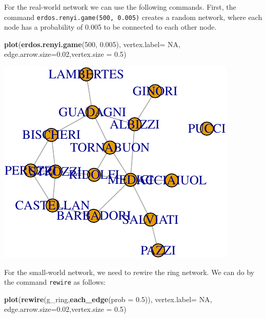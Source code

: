 \documentclass[]{article}
\newenvironment{Shaded}{\begin{snugshade}}{\end{snugshade}}
\newcommand{\KeywordTok}[1]{\textcolor[rgb]{0.13,0.29,0.53}{\textbf{{#1}}}}
\newcommand{\DataTypeTok}[1]{\textcolor[rgb]{0.13,0.29,0.53}{{#1}}}
\newcommand{\DecValTok}[1]{\textcolor[rgb]{0.00,0.00,0.81}{{#1}}}
\newcommand{\FloatTok}[1]{\textcolor[rgb]{0.00,0.00,0.81}{{#1}}}
\newcommand{\OtherTok}[1]{\textcolor[rgb]{0.56,0.35,0.01}{{#1}}}
\newcommand{\NormalTok}[1]{{#1}}
\begin{document}
For the real-world network we can use the following commands. First, the
command \texttt{erdos.renyi.game(500,\ 0.005)} creates a random network,
where each node has a probability of 0.005 to be connected to each other
node.

\begin{Shaded}
\begin{Highlighting}[]
\KeywordTok{plot}\NormalTok{(}\KeywordTok{erdos.renyi.game}\NormalTok{(}\DecValTok{500}\NormalTok{, }\FloatTok{0.005}\NormalTok{), }\DataTypeTok{vertex.label=} \OtherTok{NA}\NormalTok{, }\DataTypeTok{edge.arrow.size=}\FloatTok{0.02}\NormalTok{,}\DataTypeTok{vertex.size =} \FloatTok{0.5}\NormalTok{)}
\end{Highlighting}
\end{Shaded}

\includegraphics{ResearchTools_files/figure-latex/unnamed-chunk-51-1.pdf}

For the small-world network, we need to rewire the ring network. We can
do by the command \texttt{rewire} as follows:

\begin{Shaded}
\begin{Highlighting}[]
\KeywordTok{plot}\NormalTok{(}\KeywordTok{rewire}\NormalTok{(g_ring,}\KeywordTok{each_edge}\NormalTok{(}\DataTypeTok{prob =} \FloatTok{0.5}\NormalTok{)), }\DataTypeTok{vertex.label=} \OtherTok{NA}\NormalTok{, }\DataTypeTok{edge.arrow.size=}\FloatTok{0.02}\NormalTok{,}\DataTypeTok{vertex.size =} \FloatTok{0.5}\NormalTok{)}
\end{Highlighting}
\end{Shaded}
\end{document}
